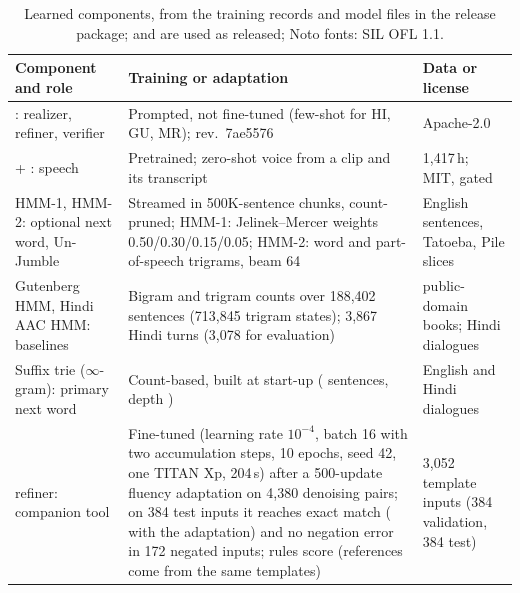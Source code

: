 \begin{table}[!t]
\centering\footnotesize
\setlength{\tabcolsep}{3pt}\renewcommand{\arraystretch}{1.02}
\begin{tabular}{@{}L{4.0cm}L{8.1cm}L{3.4cm}@{}}
\toprule
{}
Component and role & Training or adaptation & Data or license \\
\midrule
\qwen{}: realizer, refiner, verifier & Prompted, not fine-tuned (few-shot for HI, GU, MR); rev.\ 7ae5576 & Apache-2.0 \\
\indicf{} + \vocos{}: speech & Pretrained; zero-shot voice from a clip and its transcript & 1,417\,h; MIT, gated \\
HMM-1, HMM-2: optional next word, Un-Jumble & Streamed in 500K-sentence chunks, count-pruned; HMM-1: Jelinek--Mercer weights 0.50/0.30/0.15/0.05; HMM-2: word and part-of-speech trigrams, beam 64 & English sentences, Tatoeba, Pile slices \\
Gutenberg HMM, Hindi AAC HMM: baselines & Bigram and trigram counts over 188,402 sentences (713,845 trigram states); 3,867 Hindi turns (3,078 for evaluation) & public-domain books; Hindi dialogues \\
Suffix trie ($\infty$-gram): primary next word & Count-based, built at start-up (\IGSent{} sentences, depth \IGDepth{}) & English and Hindi dialogues \\
\flant{} refiner: companion tool & Fine-tuned (learning rate $10^{-4}$, batch 16 with two accumulation steps, 10 epochs, seed 42, one TITAN Xp, 204\,s) after a 500-update fluency adaptation on 4,380 denoising pairs; on 384 test inputs it reaches \RefAModel{} exact match (\RefFModel{} with the adaptation) and no negation error in 172 negated inputs; rules score \RefARules{} (references come from the same templates) & 3,052 template inputs (384 validation, 384 test) \\
\bottomrule
\end{tabular}
\caption{Learned components, from the training records and model files in the release package; \qwen{} and \indicf{} are used as released; Noto fonts: SIL OFL 1.1.}
\label{tab:models}
\end{table}



